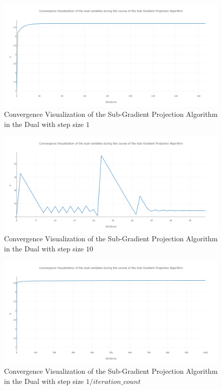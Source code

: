 \documentclass[12pt, draftcls, onecolumn]{IEEEtran}
\begin{document}
\begin{figure}[t]
\includegraphics[width=1.0\textwidth]{Convergence_Plot_Step_Size_1.png}
\caption{Convergence Visualization of the Sub-Gradient Projection Algorithm in the Dual with step size $1$}
\label{fig:mesh11}
\centering
\end{figure}
\begin{figure}[t]
\includegraphics[width=1.0\textwidth]{Convergence_Plot_Step_Size_10.png}
\caption{Convergence Visualization of the Sub-Gradient Projection Algorithm in the Dual with step size $10$}
\label{fig:mesh12}
\centering
\end{figure}
\begin{figure}[t]
\includegraphics[width=1.0\textwidth]{Convergence_Plot_Step_Size_1byk_2.png}
\caption{Convergence Visualization of the Sub-Gradient Projection Algorithm in the Dual with step size $1/iteration\_count$}
\label{fig:mesh13}
\centering
\end{figure}
\clearpage
\end{document}
